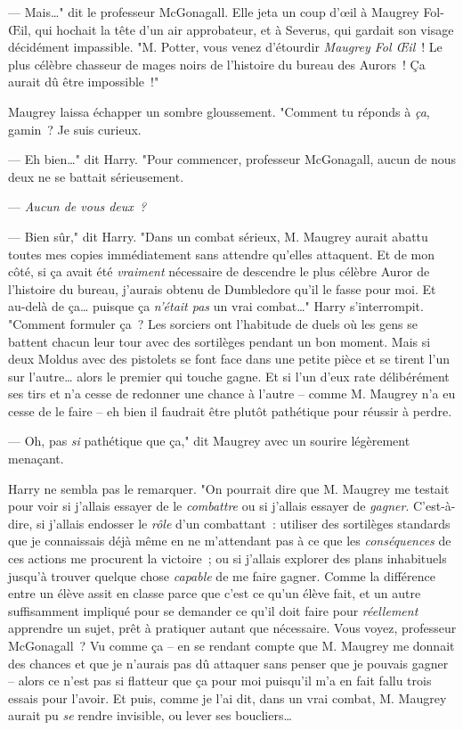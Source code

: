 --- Mais…" dit le professeur McGonagall. Elle jeta un coup d'œil à Maugrey Fol-Œil, qui hochait la tête d'un air approbateur, et à Severus, qui gardait son visage décidément impassible. "M. Potter, vous venez d'étourdir \emph{Maugrey Fol Œil}~! Le plus célèbre chasseur de mages noirs de l'histoire du bureau des Aurors~! Ça aurait dû être impossible~!"

Maugrey laissa échapper un sombre gloussement. "Comment tu réponds à \emph{ça}, gamin~? Je suis curieux.

--- Eh bien…" dit Harry. "Pour commencer, professeur McGonagall, aucun de nous deux ne se battait sérieusement.

--- \emph{Aucun de vous deux~?}

--- Bien sûr," dit Harry. "Dans un combat sérieux, M. Maugrey aurait abattu toutes mes copies immédiatement sans attendre qu'elles attaquent. Et de mon côté, si ça avait été \emph{vraiment} nécessaire de descendre le plus célèbre Auror de l'histoire du bureau, j'aurais obtenu de Dumbledore qu'il le fasse pour moi. Et au-delà de ça… puisque ça \emph{n'était pas} un vrai combat…" Harry s'interrompit. "Comment formuler ça~? Les sorciers ont l'habitude de duels où les gens se battent chacun leur tour avec des sortilèges pendant un bon moment. Mais si deux Moldus avec des pistolets se font face dans une petite pièce et se tirent l'un sur l'autre… alors le premier qui touche gagne. Et si l'un d'eux rate délibérément ses tirs et n'a cesse de redonner une chance à l'autre -- comme M. Maugrey n'a eu cesse de le faire -- eh bien il faudrait être plutôt pathétique pour réussir à perdre.

--- Oh, pas \emph{si} pathétique que ça," dit Maugrey avec un sourire légèrement menaçant.

Harry ne sembla pas le remarquer. "On pourrait dire que M. Maugrey me testait pour voir si j'allais essayer de le \emph{combattre} ou si j'allais essayer de \emph{gagner}. C'est-à-dire, si j'allais endosser le \emph{rôle} d'un combattant~: utiliser des sortilèges standards que je connaissais déjà même en ne m'attendant pas à ce que les \emph{conséquences} de ces actions me procurent la victoire~; ou si j'allais explorer des plans inhabituels jusqu'à trouver quelque chose \emph{capable} de me faire gagner. Comme la différence entre un élève assit en classe parce que c'est ce qu'un élève fait, et un autre suffisamment impliqué pour se demander ce qu'il doit faire pour \emph{réellement} apprendre un sujet, prêt à pratiquer autant que nécessaire. Vous voyez, professeur McGonagall~? Vu comme ça -- en se rendant compte que M. Maugrey me donnait des chances et que je n'aurais pas dû attaquer sans penser que je pouvais gagner -- alors ce n'est pas si flatteur que ça pour moi puisqu'il m'a en fait fallu trois essais pour l'avoir. Et puis, comme je l'ai dit, dans un vrai combat, M. Maugrey aurait pu \emph{se} rendre invisible, ou lever ses boucliers…

